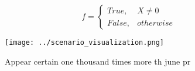 \documentclass[a4paper]{article}
\begin{document}
\begin{equation}   f =
\begin{cases} True, & X \neq 0\\
False, & otherwise
\end{cases}
\end{equation}

\begin{figure}
\centering
\texttt{[image: ../scenario\_visualization.png]}
\caption{Appear certain one thousand times more th june pr
}
\end{figure}
 
\end{document}
